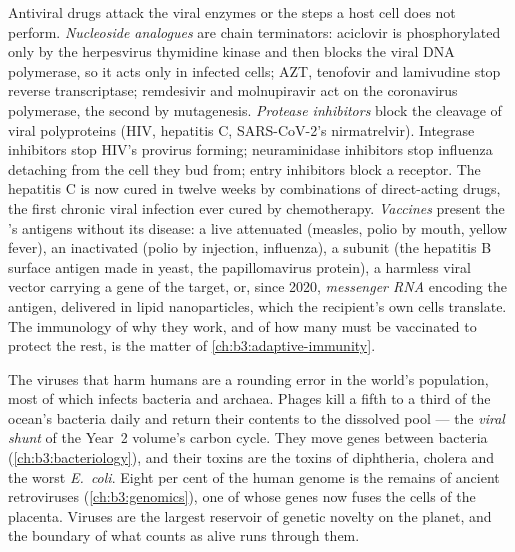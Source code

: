 \begin{definition}\label{def:b3:virology:drugs}
Antiviral drugs attack the viral enzymes or the steps a host cell
does not perform. \emph{Nucleoside analogues} are chain terminators: aciclovir
is phosphorylated only by the herpesvirus thymidine kinase and then
blocks the viral DNA polymerase, so it acts only in infected cells;
AZT, tenofovir and lamivudine stop reverse transcriptase; remdesivir and
molnupiravir act on the coronavirus polymerase, the second by
mutagenesis. \emph{Protease inhibitors} block the cleavage of viral
polyproteins (HIV, hepatitis C, SARS-CoV-2's nirmatrelvir). Integrase
inhibitors stop HIV's provirus forming; neuraminidase inhibitors stop
influenza  detaching from the cell they bud from; entry
inhibitors block a receptor. The hepatitis C  is now cured in
twelve weeks by combinations of direct-acting drugs, the first chronic
viral infection ever cured by chemotherapy. \emph{Vaccines} present the
's antigens without its disease: a live attenuated  (measles,
polio by mouth, yellow fever), an inactivated  (polio by injection,
influenza), a subunit (the hepatitis B surface antigen made in yeast,
the papillomavirus  protein), a harmless viral vector carrying a
gene of the target, or, since 2020, \emph{messenger RNA} encoding the
antigen, delivered in lipid nanoparticles, which the recipient's own
cells translate. The immunology of why they work, and of how many must
be vaccinated to protect the rest, is the matter of
\cref{ch:b3:adaptive-immunity}.
\end{definition}

\begin{remark}\label{rem:b3:virology:economy}
The viruses that harm humans are a rounding error in the world's 
population, most of which infects bacteria and archaea. Phages kill a
fifth to a third of the ocean's bacteria daily and return their
contents to the dissolved pool --- the \emph{viral shunt} of the
Year~2 volume's carbon cycle. They move genes between bacteria
(\cref{ch:b3:bacteriology}), and their toxins are the toxins of
diphtheria, cholera and the worst \emph{E.~coli}. Eight per cent of the
human genome is the remains of ancient retroviruses
(\cref{ch:b3:genomics}), one of whose  genes now fuses the
cells of the placenta. Viruses are the largest reservoir of genetic
novelty on the planet, and the boundary of what counts as alive runs
through them.
\end{remark}

